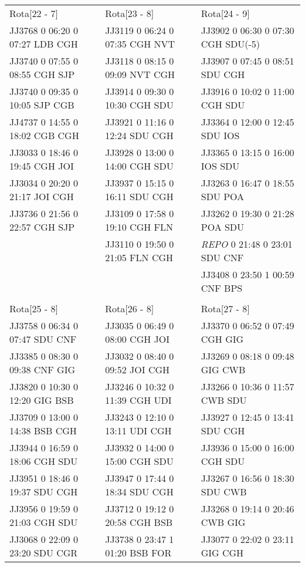 \begin{scriptsize}
\begin{longtable}{l l l}
\\

Rota[22 - 7]  & Rota[23 - 8]  & Rota[24 - 9] \\
JJ3768 0 06:20 0 07:27 LDB CGH & JJ3119 0 06:24 0 07:35 CGH NVT & JJ3902 0 06:30
0 07:30 CGH SDU(-5)\\
JJ3740 0 07:55 0 08:55 CGH SJP & JJ3118 0 08:15 0 09:09 NVT CGH & JJ3907 0 07:45 0 08:51 SDU CGH\\
JJ3740 0 09:35 0 10:05 SJP CGB & JJ3914 0 09:30 0 10:30 CGH SDU & JJ3916 0 10:02 0 11:00 CGH SDU\\
JJ4737 0 14:55 0 18:02 CGB CGH & JJ3921 0 11:16 0 12:24 SDU CGH & JJ3364 0 12:00 0 12:45 SDU IOS\\
JJ3033 0 18:46 0 19:45 CGH JOI & JJ3928 0 13:00 0 14:00 CGH SDU & JJ3365 0 13:15 0 16:00 IOS SDU\\
JJ3034 0 20:20 0 21:17 JOI CGH & JJ3937 0 15:15 0 16:11 SDU CGH & JJ3263 0 16:47 0 18:55 SDU POA\\
JJ3736 0 21:56 0 22:57 CGH SJP & JJ3109 0 17:58 0 19:10 CGH FLN & JJ3262 0 19:30 0 21:28 POA SDU\\
 & JJ3110 0 19:50 0 21:05 FLN CGH & \textit{REPO} 0 21:48 0 23:01 SDU CNF\\
 &  & JJ3408 0 23:50 1 00:59 CNF BPS\\

\\

Rota[25 - 8]  & Rota[26 - 8]  & Rota[27 - 8] \\
JJ3758 0 06:34 0 07:47 SDU CNF & JJ3035 0 06:49 0 08:00 CGH JOI & JJ3370 0 06:52 0 07:49 CGH GIG\\
JJ3385 0 08:30 0 09:38 CNF GIG & JJ3032 0 08:40 0 09:52 JOI CGH & JJ3269 0 08:18 0 09:48 GIG CWB\\
JJ3820 0 10:30 0 12:20 GIG BSB & JJ3246 0 10:32 0 11:39 CGH UDI & JJ3266 0 10:36 0 11:57 CWB SDU\\
JJ3709 0 13:00 0 14:38 BSB CGH & JJ3243 0 12:10 0 13:11 UDI CGH & JJ3927 0 12:45 0 13:41 SDU CGH\\
JJ3944 0 16:59 0 18:06 CGH SDU & JJ3932 0 14:00 0 15:00 CGH SDU & JJ3936 0 15:00 0 16:00 CGH SDU\\
JJ3951 0 18:46 0 19:37 SDU CGH & JJ3947 0 17:44 0 18:34 SDU CGH & JJ3267 0 16:56 0 18:30 SDU CWB\\
JJ3956 0 19:59 0 21:03 CGH SDU & JJ3712 0 19:12 0 20:58 CGH BSB & JJ3268 0 19:14 0 20:46 CWB GIG\\
JJ3068 0 22:09 0 23:20 SDU CGR & JJ3738 0 23:47 1 01:20 BSB FOR & JJ3077 0 22:02 0 23:11 GIG CGH\\


\end{longtable}
\end{scriptsize}
